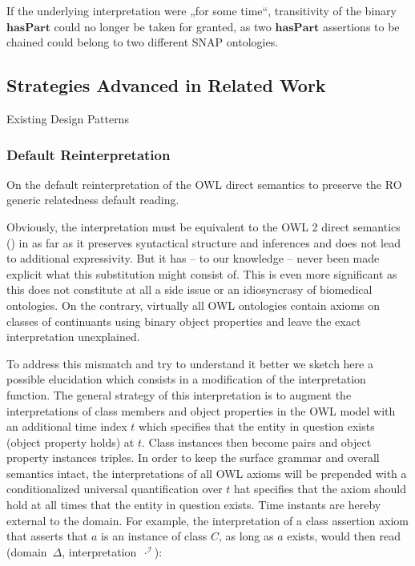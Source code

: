 \documentclass[10pt]{bmc_article}
\newcommand{\mirel}[1]{\ensuremath{\mathrm{\mathbf{#1}}}}
\newcommand{\mclass}[1]{\ensuremath{\mathit{#1}}}
\newenvironment{bmcformat}{\baselineskip20pt\sloppy\setboolean{publ}{false}}{\baselineskip20pt\sloppy}
\begin{document}
\begin{bmcformat}
If the underlying interpretation were „for some time“, transitivity of the
binary \mirel{hasPart} could no longer be taken for granted, as two
\mirel{hasPart} assertions to be chained could belong to two different SNAP
ontologies.

\subsection*{Strategies Advanced in Related Work}
Existing Design Patterns

\subsubsection*{Default Reinterpretation}

On the default reinterpretation of the OWL direct semantics to preserve the RO 
generic relatedness default reading. 

Obviously, the interpretation must be equivalent to the OWL 2 direct semantics
(\cite{OWL2:direct}) in as far as it preserves syntactical structure and inferences and does not
lead to additional expressivity. But it has – to our knowledge – never been made
explicit what this substitution might consist of.  This is even more significant
as this does not constitute at all a side issue or an idiosyncrasy of biomedical
ontologies. On the contrary, virtually all OWL ontologies contain axioms on
classes of continuants using binary object properties and leave the exact
interpretation unexplained. 

To address this mismatch and try to understand it better we sketch here a
possible elucidation  which consists in a modification of the interpretation
function. The general strategy of this interpretation is to augment the
interpretations of class members and object properties in the OWL model with an
additional time index $t$ which specifies that the entity in question exists
(object property holds) at $t$. Class instances then become pairs and object
property instances triples. In order to keep the surface grammar and overall
semantics intact, the interpretations of all OWL axioms will be prepended with a
conditionalized universal quantification over $t$  hat specifies that the axiom
should hold at all times that the entity in question exists.  Time instants are
hereby external to the domain. For example, the interpretation of a class
assertion axiom that asserts that $a$ is an instance of class \mclass{C}, as long
as $a$ exists, would then read (domain~$\Delta$, interpretation~$\cdot^\mathcal{I}$):


\end{bmcformat}
\end{document}

